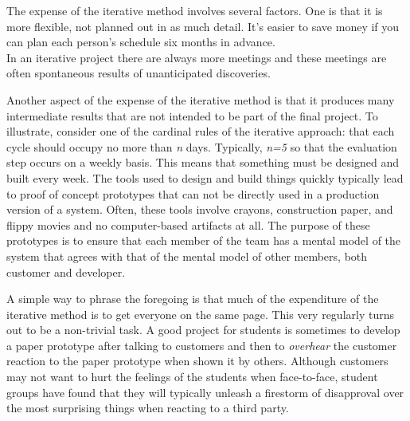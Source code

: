 The expense of the iterative method involves several factors. One is
that it is more flexible, not planned out in as much detail. It's easier
to save money if you can plan each person's schedule six months in
advance.\\
In an iterative project there are always more meetings and these
meetings are often spontaneous results of unanticipated discoveries.

\hypertarget{extra-products-of-the-iterative-method}{%
\label{extra-products-of-the-iterative-method}}

Another aspect of the expense of the iterative method is that it
produces many intermediate results that are not intended to be part of
the final project. To illustrate, consider one of the cardinal rules of
the iterative approach: that each cycle should occupy no more than
\emph{n} days. Typically, \emph{n=5} so that the evaluation step occurs
on a weekly basis. This means that something must be designed and built
every week. The tools used to design and build things quickly typically
lead to proof of concept prototypes that can not be directly used in a
production version of a system. Often, these tools involve crayons,
construction paper, and flippy movies and no computer-based artifacts at
all. The purpose of these prototypes is to ensure that each member of
the team has a mental model of the system that agrees with that of the
mental model of other members, both customer and developer.

\hypertarget{getting-everyone-on-the-same-page}{%
\label{getting-everyone-on-the-same-page}}

A simple way to phrase the foregoing is that much of the expenditure of
the iterative method is to get everyone on the same page. This very
regularly turns out to be a non-trivial task. A good project for
students is sometimes to develop a paper prototype after talking to
customers and then to \emph{overhear} the customer reaction to the paper
prototype when shown it by others. Although customers may not want to
hurt the feelings of the students when face-to-face, student groups have
found that they will typically unleash a firestorm of disapproval over
the most surprising things when reacting to a third party.

\hypertarget{evaluation-in-iterative-development}{%
\label{evaluation-in-iterative-development}}

